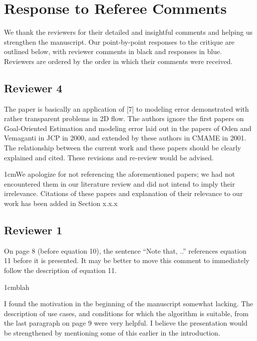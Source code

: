 \documentclass[12pt, letterpaper]{article}
\newcommand{\answer}[1]{\begin{adjustwidth}{1cm}{}{\color{blue}#1}\end{adjustwidth}}
\newcommand{\red}[1]{{\color{red}#1}}
\newcommand{\blue}[1]{{\color{blue}#1}}
\newcommand{\notdone}{{\color{red}{Changes not yet made.}}}
\begin{document}
\section*{Response to Referee Comments}

We thank the reviewers for their detailed and insightful comments and helping us strengthen the manuscript. Our point-by-point responses to the critique are outlined below, with reviewer comments in black and \blue{responses in blue}. Reviewers are ordered by the order in which their comments were received.


\subsection*{Reviewer 4}

The paper is basically an application of [7] to modeling error demonstrated with rather transparent problems in 2D flow. The authors ignore the first papers on Goal-Oriented Estimation and modeling error laid out in the papers of Oden and Vemaganti in JCP in 2000, and extended by these authors in CMAME in 2001. The relationship between the current work and these papers should be clearly explained and cited. These revisions and re-review would be advised.

\answer{We apologize for not referencing the aforementioned papers; we had not encountered them in our literature review and did not intend to imply their irrelevance. Citations of these papers and explanation of their relevance to our work has been added in \red{Section x.x.x}}
\notdone


\subsection*{Reviewer 1}

On page 8 (before equation 10), the sentence “Note that, ..” references equation 11 before it is
presented. It may be better to move this comment to immediately follow the description of equation
11.

\answer{blah}
\notdone

I found the motivation in the beginning of the manuscript somewhat lacking. The description of use
cases, and conditions for which the algorithm is suitable, from the last paragraph on page 9 were very
helpful. I believe the presentation would be strengthened by mentioning some of this earlier in the
introduction.
\end{document}
